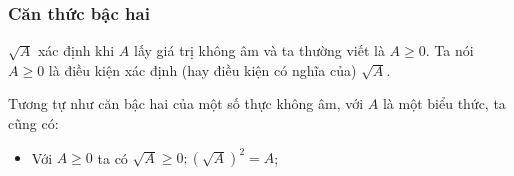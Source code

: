 \begin{tomtat}
\subsubsection{Căn thức bậc hai}
\begin{boxdn}
$\sqrt{A}$ xác định khi $A$ lấy giá trị không âm và ta thường viết là $A\ge 0$. Ta nói $A\ge 0$ là {\color{red}điều kiện xác định} (hay điều kiện có nghĩa của) $\sqrt{A}$.
\end{boxdn}
\begin{note}
 Tương tự như căn bậc hai của một số thực không âm, với $A$ là một biểu thức, ta cũng có:
 \begin{itemize}
 	\item Với $A \geq 0$ ta có $\sqrt{A} \geq 0 ;\left(\sqrt{A}\right)^2=A$;
 \end{itemize}
\end{note}
\end{tomtat}
